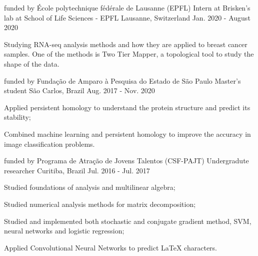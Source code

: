

\begin{cventries}

  \cventry
    {funded by École polytechnique fédérale de Lausanne (EPFL)}
    {Intern at Brisken's lab at School of Life Sciences - EPFL}
    {Lausanne, Switzerland} 
    {Jan. 2020 - August 2020} 
    {
      \begin{cvitems} 
        \item {Studying RNA-seq analysis methods and how they are applied 
            to breast cancer samples. One of the methods is 
            Two Tier Mapper, a topological tool to study the shape of the data.}
      \end{cvitems} 
    }
  \cventry
    {funded by Fundação de Amparo à Pesquisa do Estado de São Paulo} %
    {Master's student} %
    {São Carlos, Brazil} %
    {Aug. 2017 - Nov. 2020} %
    {
      \begin{cvitems} %
        \item {Applied persistent homology to understand the protein structure
        and predict its stability;}
        \item {Combined machine learning and persistent homology to improve
        the accuracy in image classification problems.}
      \end{cvitems}
    }

\cventry
  {funded by Programa de Atração de Jovens Talentos (CSF-PAJT)} %
  {Undergradute researcher} %
  {Curitiba, Brazil} %
  {Jul. 2016 - Jul. 2017} %
  {
    \begin{cvitems} %
      \item {Studied foundations of analysis and multilinear algebra;}
      \item {Studied numerical analysis methods for matrix decomposition;}
      \item {Studied and implemented both stochastic and conjugate gradient
      method, SVM, neural networks and logistic regression;}
      \item {Applied Convolutional Neural Networks to predict LaTeX characters.}
    \end{cvitems}
  }

\end{cventries}
